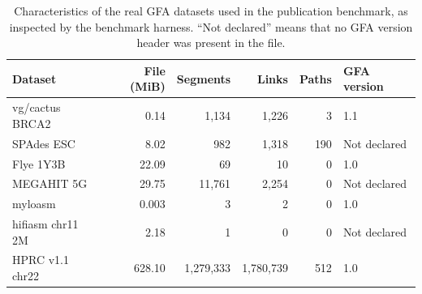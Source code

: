 \documentclass[11pt]{article}
\begin{document}
\begin{table}[ht]
\centering
\caption{Characteristics of the real GFA datasets used in the publication benchmark, as inspected by the benchmark harness. ``Not declared'' means that no GFA version header was present in the file.}
\label{tab:dataset-characteristics}
\scriptsize
\begin{tabular}{lrrrrl}
\toprule
Dataset & File (MiB) & Segments & Links & Paths & GFA version\\
\midrule
vg/cactus BRCA2 & 0.14 & 1,134 & 1,226 & 3 & 1.1\\
SPAdes ESC & 8.02 & 982 & 1,318 & 190 & Not declared\\
Flye 1Y3B & 22.09 & 69 & 10 & 0 & 1.0\\
MEGAHIT 5G & 29.75 & 11,761 & 2,254 & 0 & Not declared\\
myloasm & 0.003 & 3 & 2 & 0 & 1.0\\
hifiasm chr11 2M & 2.18 & 1 & 0 & 0 & Not declared\\
HPRC v1.1 chr22 & 628.10 & 1,279,333 & 1,780,739 & 512 & 1.0\\
\bottomrule
\end{tabular}
\end{table}
\end{document}

